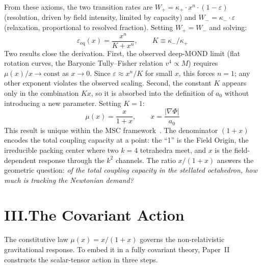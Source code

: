 \documentclass[11pt]{article}
\begin{document}
From these axioms, the two transition rates are $W_+ = \kappa_+ \cdot x^n \cdot (1 - \varepsilon)$ (resolution, driven by field intensity, limited by capacity) and $W_- = \kappa_- \cdot \varepsilon$ (relaxation, proportional to resolved fraction). Setting $W_+ = W_-$ and solving:
\begin{equation}
\varepsilon_{\text{eq}}(x) = \frac{x^n}{K + x^n}, \qquad K \equiv \kappa_- / \kappa_+
\label{eq:equil}
\end{equation}
Two results close the derivation. First, the observed deep-MOND limit (flat rotation curves, the Baryonic Tully--Fisher relation $v^4 \propto M$) requires $\mu(x)/x \to \text{const}$ as $x \to 0$. Since $\varepsilon \approx x^n/K$ for small $x$, this forces $n = 1$; any other exponent violates the observed scaling. Second, the constant $K$ appears only in the combination $Kx$, so it is absorbed into the definition of $a_0$ without introducing a new parameter. Setting $K = 1$:
\begin{equation}
\boxed{\mu(x) = \frac{x}{1+x}, \qquad x = \frac{|\nabla\Phi|}{a_0}}
\label{eq:mu}
\end{equation}
This result is unique within the MSC framework~\cite{paper1}. The denominator $(1 + x)$ encodes the total coupling capacity at a point: the ``1'' is the Field Origin, the irreducible packing center where two $k = 4$ tetrahedra meet, and $x$ is the field-dependent response through the $k^2$ channels. The ratio $x/(1+x)$ answers the geometric question: \emph{of the total coupling capacity in the stellated octahedron, how much is tracking the Newtonian demand?}

\section*{III.\quad The Covariant Action}

The constitutive law $\mu(x) = x/(1+x)$ governs the non-relativistic gravitational response. To embed it in a fully covariant theory, Paper~II~\cite{paper2} constructs the scalar-tensor action in three steps.
\end{document}
